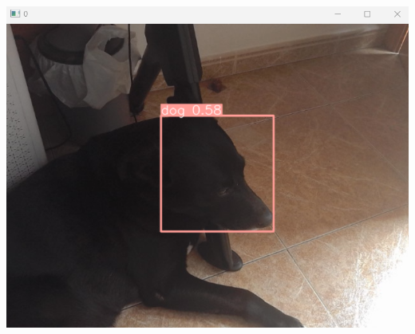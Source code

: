 \documentclass[11pt]{article}
\begin{document}
\begin{longtable}[]
\includegraphics{predicts/Captura de pantalla 2024-05-08 142922.png} \\
\end{longtable}


    
    
    
\end{document}
